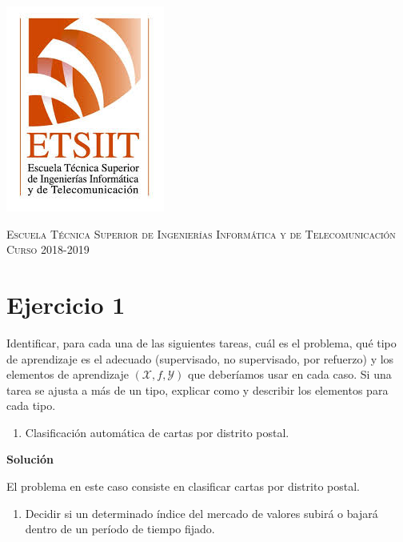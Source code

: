 \documentclass[11pt,a4paper]{article}
\newcommand{\answer}{\noindent\textbf{Solución}}
\begin{document}
\begin{titlepage}
\begin{minipage}{\textwidth}
\includegraphics[scale=0.3]{img/etsiit.jpeg}

\vspace{0.7cm}
\textsc{Escuela Técnica Superior de Ingenierías Informática y de Telecomunicación}\\
\vspace{1cm}
\textsc{Curso 2018-2019}
\end{minipage}
\end{titlepage}

\tableofcontents
\thispagestyle{empty}				%

\newpage

\setlength{\parskip}{1em}

\section*{Ejercicio 1}

\noindent Identificar, para cada una de las siguientes tareas, cuál es el problema, qué tipo de aprendizaje es el adecuado
(supervisado, no supervisado, por refuerzo) y los elementos de aprendizaje $(\mathcal{X} , f, \mathcal{Y})$ que deberíamos
usar en cada caso. Si una tarea se ajusta a más de un tipo, explicar como y describir los elementos para cada tipo.

\begin{enumerate}[label=\textit{\alph*})]
	\item Clasificación automática de cartas por distrito postal.
\end{enumerate}

\answer

El problema en este caso consiste en clasificar cartas por distrito postal.

\begin{enumerate}[resume,label=\textit{\alph*})]
	\item Decidir si un determinado índice del mercado de valores subirá o bajará dentro de un período de tiempo fijado.
\end{enumerate}
\end{document}
